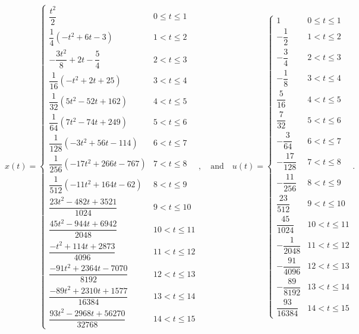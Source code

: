 \begin{equation}
  x(t) = \begin{cases}
    \dfrac{t^2}{2} & 0\leq t\leq 1 \\[0.1em]
    \dfrac{1}{4} \left(-t^2+6 t-3\right) & 1<t\leq 2 \\[0.1em]
    -\dfrac{3 t^2}{8}+2 t-\dfrac{5}{4} & 2<t\leq 3 \\[0.1em]
    \dfrac{1}{16} \left(-t^2+2 t+25\right) & 3<t\leq 4 \\[0.1em]
    \dfrac{1}{32} \left(5 t^2-52 t+162\right) & 4<t\leq 5 \\[0.1em]
    \dfrac{1}{64} \left(7 t^2-74 t+249\right) & 5<t\leq 6 \\[0.1em]
    \dfrac{1}{128} \left(-3 t^2+56 t-114\right) & 6<t\leq 7 \\[0.1em]
    \dfrac{1}{256} \left(-17 t^2+266 t-767\right) & 7<t\leq 8 \\[0.1em]
    \dfrac{1}{512} \left(-11 t^2+164 t-62\right) & 8<t\leq 9 \\[0.1em]
    \dfrac{23 t^2-482 t+3521}{1024} & 9<t\leq 10 \\[0.1em]
    \dfrac{45 t^2-944 t+6942}{2048} & 10<t\leq 11 \\[0.1em]
    \dfrac{-t^2+114 t+2873}{4096} & 11<t\leq 12 \\[0.1em]
    \dfrac{-91 t^2+2364 t-7070}{8192} & 12<t\leq 13 \\[0.1em]
    \dfrac{-89 t^2+2310 t+1577}{16384} & 13<t\leq 14 \\[0.1em]
    \dfrac{93 t^2-2968 t+56270}{32768} & 14<t\leq 15
  \end{cases},
  \quad \text{and} \quad u(t) = \begin{cases}
    1 & 0\leq t\leq 1 \\[0.1em]
    -\dfrac{1}{2} & 1<t\leq 2 \\[0.1em]
    -\dfrac{3}{4} & 2<t\leq 3 \\[0.1em]
    -\dfrac{1}{8} & 3<t\leq 4 \\[0.1em]
    \dfrac{5}{16} & 4<t\leq 5 \\[0.1em]
    \dfrac{7}{32} & 5<t\leq 6 \\[0.1em]
    -\dfrac{3}{64} & 6<t\leq 7 \\[0.1em]
    -\dfrac{17}{128} & 7<t\leq 8 \\[0.1em]
    -\dfrac{11}{256} & 8<t\leq 9 \\[0.1em]
    \dfrac{23}{512} & 9<t\leq 10 \\[0.1em]
    \dfrac{45}{1024} & 10<t\leq 11 \\[0.1em]
    -\dfrac{1}{2048} & 11<t\leq 12 \\[0.1em]
    -\dfrac{91}{4096} & 12<t\leq 13 \\[0.1em]
    -\dfrac{89}{8192} & 13<t\leq 14 \\[0.1em]
    \dfrac{93}{16384} & 14<t\leq 15
  \end{cases}.
\end{equation}

